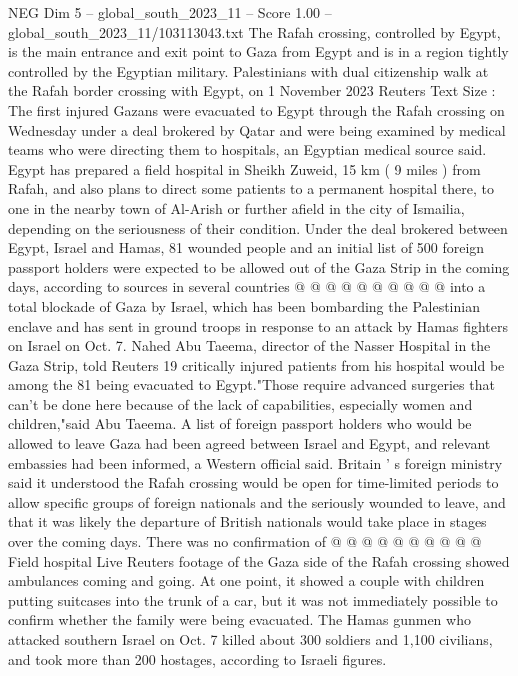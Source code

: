 \begin{textsample}{NEG Dim 5 – global\_south\_2023\_11 – Score 1.00 – global\_south\_2023\_11/103113043.txt}  \label{ex:f5_neg_174}
The Rafah crossing, controlled by Egypt, is the main entrance and exit point to Gaza from Egypt and is in a region tightly controlled by the Egyptian military.
Palestinians with dual citizenship walk at the Rafah border crossing with Egypt, on 1 November 2023 Reuters Text Size : The first injured Gazans were evacuated to Egypt through the Rafah crossing on Wednesday under a deal brokered by Qatar and were being examined by medical teams who were directing them to hospitals, an Egyptian medical source said.
Egypt has prepared a field hospital in Sheikh Zuweid, 15 km ( 9 miles ) from Rafah, and also plans to direct some patients to a permanent hospital there, to one in the nearby town of Al-Arish or further afield in the city of Ismailia, depending on the seriousness of their condition.
Under the deal brokered between Egypt, Israel and Hamas, 81 wounded people and an initial list of 500 foreign passport holders were expected to be allowed out of the Gaza Strip in the coming days, according to sources in several countries @ @ @ @ @ @ @ @ @ @ into a total blockade of Gaza by Israel, which has been bombarding the Palestinian enclave and has sent in ground troops in response to an attack by Hamas fighters on Israel on Oct. 7.
Nahed Abu Taeema, director of the Nasser Hospital in the Gaza Strip, told Reuters 19 critically injured patients from his hospital would be among the 81 being evacuated to Egypt."Those require advanced surgeries that can't be done here because of the lack of capabilities, especially women and children,"said Abu Taeema.
A list of foreign passport holders who would be allowed to leave Gaza had been agreed between Israel and Egypt, and relevant embassies had been informed, a Western official said.
Britain ' s foreign ministry said it understood the Rafah crossing would be open for time-limited periods to allow specific groups of foreign nationals and the seriously wounded to leave, and that it was likely the departure of British nationals would take place in stages over the coming days.
There was no confirmation of @ @ @ @ @ @ @ @ @ @ Field hospital Live Reuters footage of the Gaza side of the Rafah crossing showed ambulances coming and going.
At one point, it showed a couple with children putting suitcases into the trunk of a car, but it was not immediately possible to confirm whether the family were being evacuated.
The Hamas gunmen who attacked southern Israel on Oct. 7 killed about 300 soldiers and 1,100 civilians, and took more than 200 hostages, according to Israeli figures.

\end{textsample}
